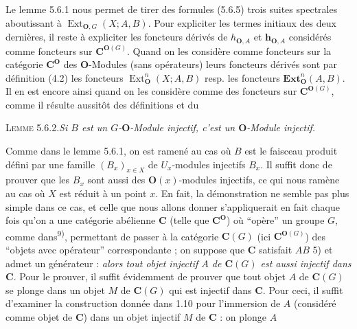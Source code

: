 Le lemme 5.6.1 nous permet de tirer des formules (5.6.5) trois suites
spectrales aboutissant à $\operatorname{Ext}_{{\mathbf O},G}(X;A,B)$. Pour
expliciter les termes initiaux des deux dernières, il reste à expliciter les
foncteurs dérivés de $h_{{\mathbf O},A}$ et $\mathbf h_{{\mathbf O},A}$ considérés comme foncteurs
sur ${\mathbf C}^{{\mathbf O}(G)}$.
Quand on les considère comme foncteurs sur la catégorie ${\mathbf C}^{\mathbf O}$ des ${\mathbf O}$-Modules
(sans opérateurs) leurs foncteurs dérivés sont par définition (4.2) les
foncteurs $\operatorname{Ext}_{\mathbf O}^n(X;A,B)$ resp. les foncteurs
$\mathbf{Ext}_{\mathbf O}^n(A,B)$. Il en est encore ainsi quand on les considère comme
des foncteurs sur ${\mathbf C}^{{\mathbf O}(G)}$, comme il résulte aussitôt des définitions et du

\textsc{Lemme 5.6.2.}\quad \textit{Si $B$ est un $G$-${\mathbf O}$-Module
injectif, c'est un ${\mathbf O}$-Module injectif.}

Comme dans le lemme 5.6.1, on est ramené au cas où $B$ est le faisceau produit
défini par une famille $(B_x)_{x\in X}$ de $U_x$-modules injectifs $B_x$. Il
suffit donc de prouver que les $B_x$ sont aussi des ${\mathbf O}(x)$-modules injectifs,
ce qui nous ramène au cas où $X$ est réduit à un point $x$.
En fait, la démonstration ne semble pas plus simple dans ce cas, et celle que
nous allons donner s'appliquerait en fait chaque fois qu'on a une catégorie
abélienne ${\mathbf C}$ (telle que ${\mathbf C}^{\mathbf O}$) où ``opère'' un groupe $G$, comme
dans\textsuperscript{9)}, permettant de passer à la catégorie ${\mathbf C}(G)$ (ici
${\mathbf C}^{{\mathbf O}(G)}$) des ``objets avec opérateur'' correspondante ; on suppose que ${\mathbf C}$
satisfait $AB$ 5) et admet un générateur : \textit{alors tout objet injectif $A$
de ${\mathbf C}(G)$ est aussi injectif dans ${\mathbf C}$}.
Pour le prouver, il suffit évidemment de prouver que tout objet $A$ de ${\mathbf C}(G)$
se plonge dans un objet $M$ de ${\mathbf C}(G)$ qui est injectif dans ${\mathbf C}$. Pour ceci, il
suffit d'examiner la construction donnée dans 1.10 pour l'immersion de $A$
(considéré comme objet de ${\mathbf C}$) dans un objet injectif $M$ de ${\mathbf C}$ : on plonge
$A$

